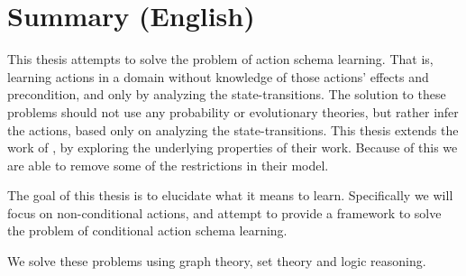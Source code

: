 \chapter{Summary (English)}


This thesis attempts to solve the problem of action schema learning.
That is, learning actions in a domain without knowledge of those actions' effects and precondition, and only by analyzing the state-transitions. The solution to these problems should not use any probability or evolutionary theories, but rather infer the actions, based only on analyzing the state-transitions. 
This thesis extends the work of \cite{Walsh2008},
by exploring the underlying properties of their work.
Because of this we are able to remove some of the restrictions in their model.

The goal of this thesis is to elucidate what it means to learn. Specifically we will focus on non-conditional actions, and attempt to provide a framework to solve the problem of conditional action schema learning.

We solve these problems using graph theory, set theory and logic reasoning.

